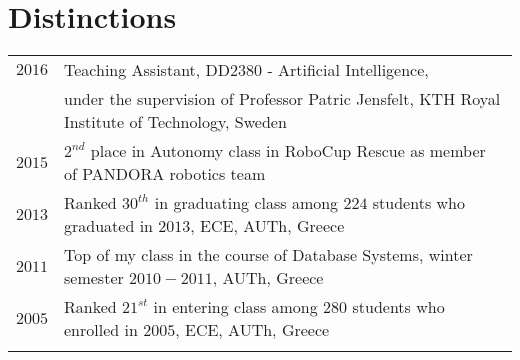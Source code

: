\documentclass[a4paper,10pt,twoside]{article}
\begin{document}
\section{Distinctions}
\begin{tabular}{rl}

$2016$ & Teaching Assistant, DD2380 - Artificial Intelligence, \\ & under the
supervision of Professor Patric Jensfelt, KTH Royal Institute of Technology, Sweden \\


$2015$ & $2^{nd}$ place in Autonomy class in RoboCup Rescue as member of PANDORA robotics team \\


$2013$ & Ranked $30^{th}$ in graduating class among $224$ students who graduated in $2013$, ECE, AUTh, Greece \\


$2011$ & Top of my class in the course of Database Systems, winter semester $2010 - 2011$,
AUTh, Greece \\


$2005$ & Ranked $21^{st}$ in entering class among $280$ students who enrolled in $2005$, ECE, AUTh, Greece\\
&\\
\end{tabular}





\end{document}
